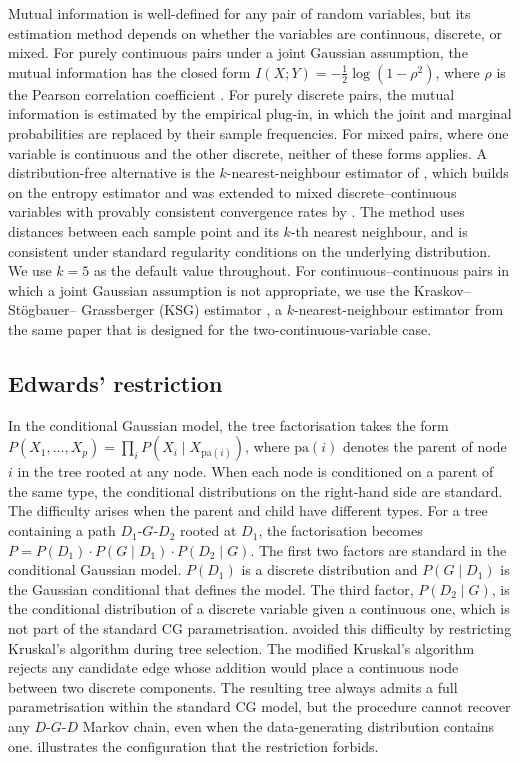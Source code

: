 Mutual information is well-defined for any pair of random variables,
but its estimation method depends on whether the variables are
continuous, discrete, or mixed. For purely continuous pairs under a
joint Gaussian assumption, the mutual information has the closed form
$I(X; Y) = -\tfrac{1}{2}\log(1 - \rho^2)$, where $\rho$ is the
Pearson correlation coefficient \citep{cover2006elements}. For purely
discrete pairs, the mutual information is estimated by the empirical
plug-in, in which the joint and marginal probabilities are replaced
by their sample frequencies. For mixed pairs, where one variable is
continuous and the other discrete, neither of these forms applies. A
distribution-free alternative is the $k$-nearest-neighbour estimator of
\citet{kraskov2004estimating}, which builds on the
\citet{kozachenko1987sample} entropy estimator and was extended to
mixed discrete--continuous variables with provably consistent
convergence rates by \citet{gao2017estimating}. The method uses
distances between each sample point and its $k$-th nearest neighbour,
and is consistent under standard regularity conditions on the
underlying distribution. We use $k = 5$ as the default value
throughout. For continuous--continuous pairs in which a joint Gaussian
assumption is not appropriate, we use the Kraskov--St\"ogbauer--%
Grassberger (KSG) estimator \citep{kraskov2004estimating}, a
$k$-nearest-neighbour estimator from the same paper that is designed
for the two-continuous-variable case.

\subsection{Edwards' restriction}
\label{subsec:edwards}

In the conditional Gaussian model, the tree factorisation takes the
form $P(X_1, \ldots, X_p) = \prod_i P(X_i \mid X_{\mathrm{pa}(i)})$,
where $\mathrm{pa}(i)$ denotes the parent of node $i$ in the tree
rooted at any node. When each node is conditioned on a parent of the same type, the
conditional distributions on the right-hand side are standard. The
difficulty arises when the parent and child have different types. For a tree containing a
path $D_1$-$G$-$D_2$ rooted at $D_1$, the factorisation becomes
$P = P(D_1) \cdot P(G \mid D_1) \cdot P(D_2 \mid G)$. The first two
factors are standard in the conditional Gaussian model. $P(D_1)$ is
a discrete distribution and $P(G \mid D_1)$ is the Gaussian
conditional that defines the model. The third factor,
$P(D_2 \mid G)$, is the conditional distribution of a discrete
variable given a continuous one, which is not part of the standard
CG parametrisation. \citet{edwards2010selecting} avoided this
difficulty by restricting Kruskal's algorithm during tree
selection. The modified Kruskal's algorithm rejects any candidate
edge whose addition would place a continuous node between two
discrete components. The resulting tree always admits a full
parametrisation within the standard CG model, but the procedure
cannot recover any $D$-$G$-$D$ Markov chain, even when the
data-generating distribution contains one.  illustrates the
configuration that the restriction forbids.

